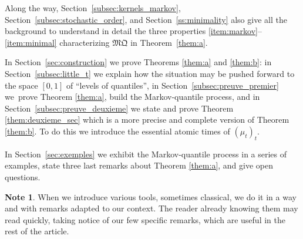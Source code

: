 \documentclass[JEP,XML,SOM,Unicode,NoEqCountersInSection,NoFloatCountersInSection,published]{cedram}
\theoremstyle{plain}
\theoremstyle{definition}
\newtheorem*{note}{Note}
\newcommand{\mq}{\mathfrak{MQ}}
\begin{document}
Along the way, Section~\ref{subsec:kernels_markov}, Section~\ref{subsec:stochastic_order}, and Section~\ref{ss:minimality} also give all the background to understand in detail the three properties \eqref{item:markov}--\eqref{item:minimal} characterizing $\mq$ in Theorem~\ref{them:a}.

In Section~\ref{sec:construction} we prove Theorems \ref{them:a} and \ref{them:b}: in Section~\ref{subsec:little_t} we explain how the situation may be pushed forward to the space $[0,1]$ of ``levels of quantiles'', in Section~\ref{subsec:preuve_premier} we~prove Theorem \ref{them:a}, \ie build the Markov-quantile process, and in Section~\ref{subsec:preuve_deuxieme} we state and prove Theorem \ref{them:deuxieme_sec} which is a more precise and complete version of Theorem \ref{them:b}. To do this we introduce the essential atomic times of $(\mu_t)_t$.

In Section~\ref{sec:exemples} we exhibit the Markov-quantile process in a series of examples, state three last remarks about Theorem \ref{them:a}, and give open questions.

\begin{note} When we introduce various tools, sometimes classical, we do it in a way and with remarks adapted to our context. The reader already knowing them may read quickly, taking notice of our few specific remarks, which are useful in the rest of the article.
\end{note}
\end{document}

